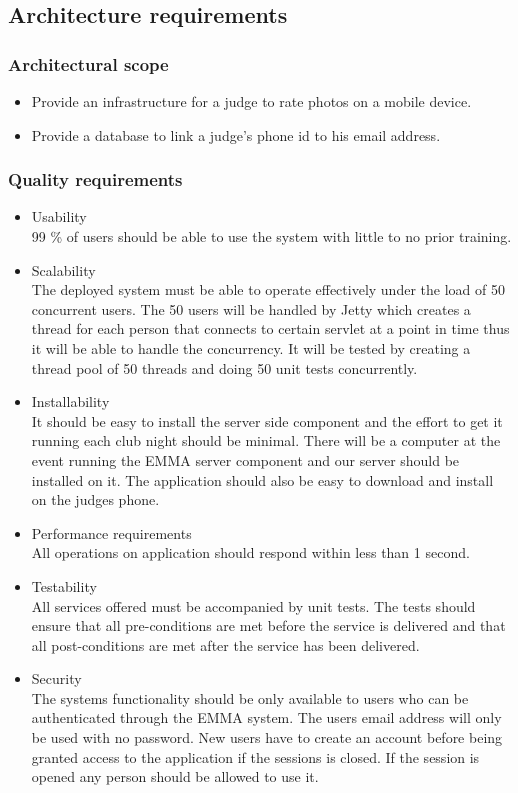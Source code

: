 \documentclass[10pt,a4paper]{article}
\begin{document}
\subsection{Architecture requirements}
\subsubsection{Architectural scope}
\begin{itemize}
\item Provide an infrastructure for a judge to rate photos on a mobile device.
\item Provide a database to link a judge's phone id to his email address.
\end{itemize}
\subsubsection{Quality requirements}
\begin{itemize}
\item Usability \\
99 \% of users should be able to use the system with little to no prior training.
\item Scalability \\
The deployed system must be able to operate effectively under the load of 50 concurrent users. The 50 users will be handled by Jetty which creates a thread for each person that connects to certain servlet at a point in time thus it will be able to handle the concurrency. It will be tested by creating a thread pool of 50 threads and doing 50 unit tests concurrently.
\item Installability \\
It should be easy to install the server side component and the effort to get it running each club night should be minimal. There will be a computer at the event running the EMMA server component and our server should be installed on it. The application should also be easy to download and install on the judges phone.
\item Performance requirements \\
 All operations on application should respond within less than 1 second.
\item Testability \\
All services offered must be accompanied by unit tests. The tests should ensure that all pre-conditions are met before the service is delivered and that all post-conditions are met after the service has been delivered.
\item Security \\
The systems functionality should be only available to users who can be authenticated through the EMMA system. The users email address will only be used with no password. New users have to create an account before being granted access to the application if the sessions is closed. If the session is opened any person should be allowed to use it.
\end{itemize}
\end{document}
